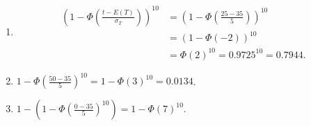 \documentclass{article}
\begin{document}
\begin{enumerate}
    \begin{enumerate}[label=(\alph*)]
        \item
        \begin{align*}
            (1 - \Phi(\frac{t - E(T)}{\sigma_T}))^{10}
                & = (1 - \Phi(\frac{25 - 35}{5}))^{10} \\
                & = (1 - \Phi(-2))^{10} \\
                & = \Phi(2)^{10} = 0.9725^{10} = 0.7944.
        \end{align*}

        \item
        $1 - \Phi(\frac{50 - 35}{5})^{10} = 1 - \Phi(3)^{10} = 0.0134$.

        \item
        $1 - (1 - \Phi(\frac{0 - 35}{5})^{10}) = 1 - \Phi(7)^{10}$.

    \end{enumerate}








\end{enumerate}
\end{document}

